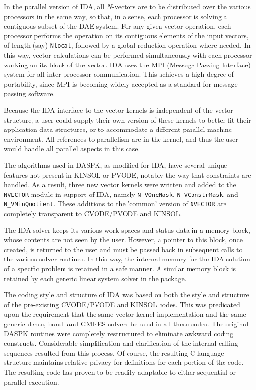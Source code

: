 \documentclass[11pt]{article}
\begin{document}
In the parallel version of IDA, all $N$-vectors are to be distributed
over the various processors in the same way, so that, in a sense, each
processor is solving a contiguous subset of the DAE system.  For any
given vector operation, each processor performs the operation on its
contiguous elements of the input vectors, of length (say) 
{\tt Nlocal}, followed by a global reduction operation where needed.
In this way, vector calculations can be performed simultaneously with
each processor working on its block of the vector.  IDA uses the MPI
(Message Passing Interface) system \cite{MPI} for all inter-processor
communication. This achieves a high degree of portability, since MPI
is becoming widely accepted as a standard for message passing
software.

Because the IDA interface to the vector kernels is independent of the
vector structure, a user could supply their own version of these
kernels to better fit their application data structures, or to
accommodate a different parallel machine environment.  All references
to parallelism are in the kernel, and thus the user would handle all
parallel aspects in this case.

The algorithms used in DASPK, as modified for IDA, have several unique
features not present in KINSOL or PVODE, notably the way that
constraints are handled.  As a result, three new vector kernels were
written and added to the {\tt NVECTOR} module in support of IDA,
namely {\tt N\_VOneMask}, {\tt N\_VConstrMask}, and {\tt N\_VMinQuotient}. 
These additions to the 'common' version of {\tt NVECTOR} are
completely transparent to CVODE/PVODE and KINSOL.

The IDA solver keeps its various work spaces and status data in a
memory block, whose contents are not seen by the user.  However, a
pointer to this block, once created, is returned to the user and must
be passed back in subsequent calls to the various solver routines.  In
this way, the internal memory for the IDA solution of a specific
problem is retained in a safe manner.  A similar memory block is
retained by each generic linear system solver in the package.

The coding style and structure of IDA was based on both the style and
structure of the pre-existing CVODE/PVODE and KINSOL codes. This was
predicated upon the requirement that the same vector kernel
implementation and the same generic dense, band, and GMRES solvers be
used in all these codes.  The original DASPK routines were completely
restructured to eliminate awkward coding constructs.  Considerable
simplification and clarification of the internal calling sequences
resulted from this process.  Of course, the resulting C language
structure maintains relative privacy for definitions for each portion
of the code.  The resulting code has proven to be readily adaptable to
either sequential or parallel execution.
\end{document}
